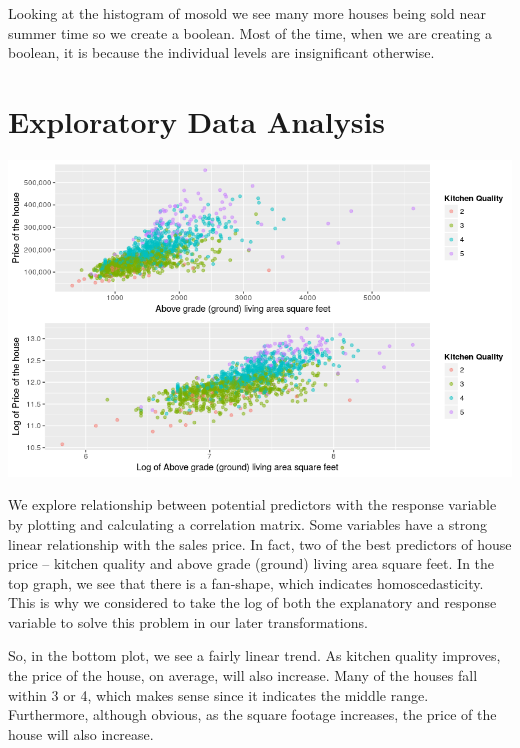 \documentclass[12pt]{article}
\begin{document}
\begin{flushleft}
Looking at the histogram of mosold we see many more houses being sold near summer time so we create a boolean. Most of the time, when we are creating a boolean, it is because the individual levels are insignificant otherwise.

\centering
\section{Exploratory Data Analysis}
    \vspace*{0.5 cm}
    \includegraphics[scale = 0.75]{plot1.png}

\begin{flushleft}
We explore relationship between potential predictors with the response variable by plotting and calculating a correlation matrix. Some variables have a strong linear relationship with the sales price. In fact, two of the best predictors of house price -- kitchen quality and above grade (ground) living area square feet. In the top graph, we see that there is a fan-shape, which indicates homoscedasticity. This is why we considered to take the log of both the explanatory and response variable to solve this problem in our later transformations.

So, in the bottom plot, we see a fairly linear trend. As kitchen quality improves, the price of the house, on average, will also increase. Many of the houses fall within 3 or 4, which makes sense since it indicates the middle range. Furthermore, although obvious, as the square footage increases, the price of the house will also increase.
\end{flushleft}


\end{flushleft}
\end{document}
